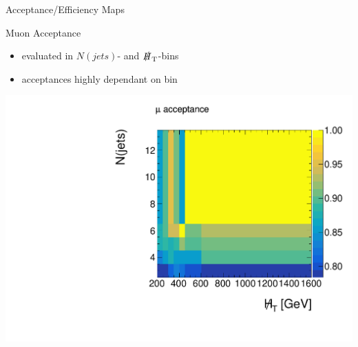 

\begin{frame}{Acceptance/Efficiency Maps}

\begin{block}{Muon Acceptance}
\begin{itemize}
\item evaluated in $N(\si{jets})$- and $\slashed H_{\si{T}}$-bins
\item acceptances highly dependant on bin
\end{itemize}
\end{block}

\begin{center}
\includegraphics[width = 0.5 \textwidth]{plots11/MuonAcceptance.pdf}
\end{center}

\end{frame}


